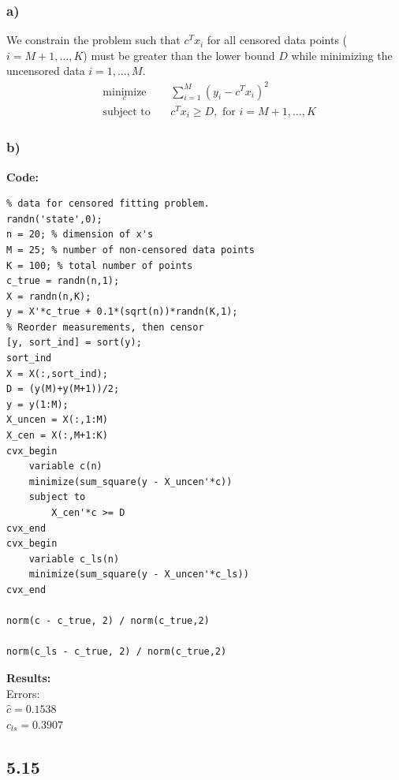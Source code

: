 \documentclass[12pt]{article}
\begin{document}
\subsubsection*{a)}
We constrain the problem such that $c^Tx_i$ for all censored data points ($i=M+1,\dots,K$) must be greater than the lower bound $D$ while minimizing the uncensored data $i=1,\dots,M$.
\begin{equation*}
\begin{aligned}
& \underset{c}{\text{minimize}}
& & \sum_{i=1}^{M}(y_i-c^Tx_i)^2\\
& \text{subject to}\
& & c^Tx_i \ge D, \text{ for } i=M+1,\dots,K
\end{aligned}
\end{equation*}
\subsubsection*{b)}
\textbf{Code:}
\begin{lstlisting}
% data for censored fitting problem.
randn('state',0);
n = 20; % dimension of x's
M = 25; % number of non-censored data points
K = 100; % total number of points
c_true = randn(n,1);
X = randn(n,K);
y = X'*c_true + 0.1*(sqrt(n))*randn(K,1);
% Reorder measurements, then censor
[y, sort_ind] = sort(y);
sort_ind
X = X(:,sort_ind);
D = (y(M)+y(M+1))/2;
y = y(1:M);
X_uncen = X(:,1:M)
X_cen = X(:,M+1:K)
cvx_begin
    variable c(n)
    minimize(sum_square(y - X_uncen'*c))
    subject to
        X_cen'*c >= D
cvx_end
cvx_begin
    variable c_ls(n)
    minimize(sum_square(y - X_uncen'*c_ls))
cvx_end

norm(c - c_true, 2) / norm(c_true,2)

norm(c_ls - c_true, 2) / norm(c_true,2)
\end{lstlisting}
\textbf{Results:}\\
Errors:\\
$\hat{c} = 0.1538$\\
$c_{ls} = 0.3907$

\subsection*{5.15}
\end{document}
